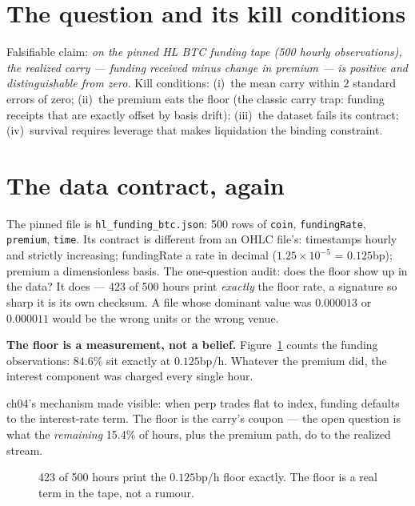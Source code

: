 \section{The question and its kill conditions}\label{sec:q18}

Falsifiable claim: \emph{on the pinned HL BTC funding tape
(500 hourly observations), the realized carry --- funding
received minus change in premium --- is positive and
distinguishable from zero.} Kill conditions: (i)~the mean carry
within $2$ standard errors of zero; (ii)~the premium eats the
floor (the classic carry trap: funding receipts that are
exactly offset by basis drift); (iii)~the dataset fails its
contract; (iv)~survival requires leverage that makes
liquidation the binding constraint.

\section{The data contract, again}\label{sec:contract18}

The pinned file is \texttt{hl\_funding\_btc.json}: 500 rows of
\texttt{coin}, \texttt{fundingRate}, \texttt{premium},
\texttt{time}. Its contract is different from an OHLC file's:
timestamps hourly and strictly increasing; fundingRate a rate
in decimal ($1.25\times10^{-5}$ = $0.125$bp); premium a
dimensionless basis. The one-question audit: does the floor
show up in the data? It does --- 423 of 500 hours print
\emph{exactly} the floor rate, a signature so sharp it is its
own checksum. A file whose dominant value was $0.000013$ or
$0.000011$ would be the wrong units or the wrong venue.

\begin{example}\label{ex:floor18}
\textbf{The floor is a measurement, not a belief.}
Figure~\ref{fig:fundhist} counts the funding observations:
$84.6\%$ sit exactly at $0.125$bp/h. Whatever the premium did,
the interest component was charged every single hour.
\begin{solution}
ch04's mechanism made visible: when perp trades flat to index,
funding defaults to the interest-rate term. The floor is the
carry's coupon --- the open question is what the
\emph{remaining} 15.4\% of hours, plus the premium path, do to
the realized stream.
\end{solution}
\end{example}

\begin{figure}[htbp]\centering

\caption{423 of 500 hours print the $0.125$bp/h floor exactly.
The floor is a real term in the tape, not a rumour.}
\label{fig:fundhist}
\end{figure}

